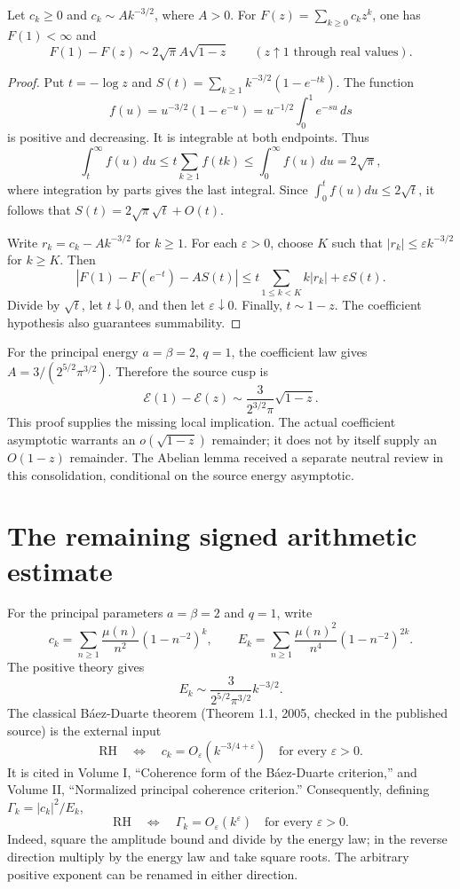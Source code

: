\begin{lemma}
Let $c_k\ge0$ and $c_k\sim A k^{-3/2}$, where $A>0$. For
$F(z)=\sum_{k\ge0}c_kz^k$, one has $F(1)<\infty$ and
\[
F(1)-F(z)\sim2\sqrt\pi A\sqrt{1-z}
\qquad(z\uparrow1\text{ through real values}).
\]
\end{lemma}
\begin{proof}
Put $t=-\log z$ and
$S(t)=\sum_{k\ge1}k^{-3/2}(1-e^{-tk})$.
The function
\[
f(u)=u^{-3/2}(1-e^{-u})
=u^{-1/2}\int_0^1e^{-su}\,ds
\]
is positive and decreasing. It is integrable at both endpoints. Thus
\[
\int_t^\infty f(u)\,du
\le t\sum_{k\ge1}f(tk)
\le\int_0^\infty f(u)\,du=2\sqrt\pi,
\]
where integration by parts gives the last integral. Since
$\int_0^t f(u)du\le2\sqrt t$, it follows that
$S(t)=2\sqrt\pi\sqrt t+O(t)$.

Write $r_k=c_k-Ak^{-3/2}$ for $k\ge1$. For each $\varepsilon>0$, choose $K$
such that $|r_k|\le\varepsilon k^{-3/2}$ for $k\ge K$. Then
\[
|F(1)-F(e^{-t})-AS(t)|
\le t\sum_{1\le k<K}k|r_k|+\varepsilon S(t).
\]
Divide by $\sqrt t$, let $t\downarrow0$, and then let $\varepsilon\downarrow0$.
Finally, $t\sim1-z$. The coefficient hypothesis also guarantees summability.
\end{proof}

For the principal energy $a=\beta=2$, $q=1$, the coefficient law gives
$A=3/(2^{5/2}\pi^{3/2})$. Therefore the source cusp is
\[
\mathcal E(1)-\mathcal E(z)
\sim\frac{3}{2^{3/2}\pi}\sqrt{1-z}.
\]
This proof supplies the missing local implication. The actual coefficient
asymptotic warrants an $o(\sqrt{1-z})$ remainder; it does not by itself supply
an $O(1-z)$ remainder. The Abelian lemma received a separate neutral review
in this consolidation, conditional on the source energy asymptotic.

\section{The remaining signed arithmetic estimate}

For the principal parameters $a=\beta=2$ and $q=1$, write
\[
c_k=\sum_{n\ge1}\frac{\mu(n)}{n^2}(1-n^{-2})^k,
\qquad
E_k=\sum_{n\ge1}\frac{\mu(n)^2}{n^4}(1-n^{-2})^{2k}.
\]
The positive theory gives
\[
E_k\sim\frac{3}{2^{5/2}\pi^{3/2}}k^{-3/2}.
\]
The classical B\'aez-Duarte theorem (Theorem 1.1, 2005, checked in the published source) is the external input
\[
\mathrm{RH}\quad\Longleftrightarrow\quad
c_k=O_\varepsilon(k^{-3/4+\varepsilon})
\quad\text{for every }\varepsilon>0.
\]
It is cited in Volume I, ``Coherence form of the B\'aez-Duarte criterion,'' and Volume II, ``Normalized principal coherence criterion.'' Consequently, defining $\Gamma_k=|c_k|^2/E_k$,
\[
\mathrm{RH}\quad\Longleftrightarrow\quad
\Gamma_k=O_\varepsilon(k^\varepsilon)
\quad\text{for every }\varepsilon>0.
\]
Indeed, square the amplitude bound and divide by the energy law; in the reverse direction multiply by the energy law and take square roots. The arbitrary positive exponent can be renamed in either direction.

